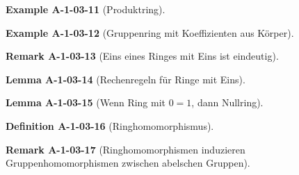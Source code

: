 \documentclass[10pt, letterpaper]{article}
\newcommand{\CustomHeading}[3]{%
  \par\medskip\noindent%
  \textbf{#1 #2} \textnormal{(#3)}.\enskip%
}
\newenvironment{DEF}[2]{\CustomHeading{Definition}{#1}{#2}}{}
\newenvironment{LEM}[2]{\CustomHeading{Lemma}{#1}{#2}}{}
\newenvironment{REM}[2]{\CustomHeading{Remark}{#1}{#2}}{}
\newenvironment{EXA}[2]{\CustomHeading{Example}{#1}{#2}}{}
\begin{document}

\begin{EXA}{A-1-03-11}{Produktring}
\end{EXA}


\begin{EXA}{A-1-03-12}{Gruppenring mit Koeffizienten aus Körper}
\end{EXA}


\begin{REM}{A-1-03-13}{Eins eines Ringes mit Eins ist eindeutig}
\end{REM}


\begin{LEM}{A-1-03-14}{Rechenregeln für Ringe mit Eins}
\end{LEM}


\begin{LEM}{A-1-03-15}{Wenn Ring mit $0=1$, dann Nullring}
\end{LEM}


\begin{DEF}{A-1-03-16}{Ringhomomorphismus}
\end{DEF}


\begin{REM}{A-1-03-17}{Ringhomomorphismen induzieren Gruppenhomomorphismen zwischen abelschen Gruppen}
\end{REM}

\end{document}

